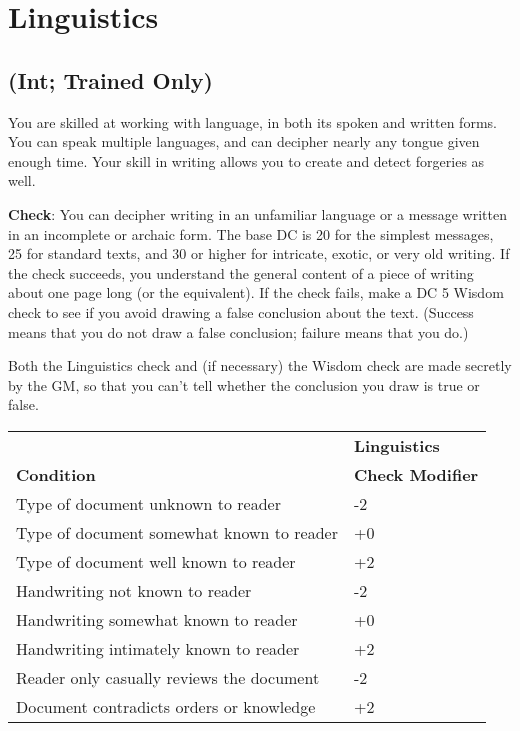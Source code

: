 \section{Linguistics}

\label{f0}
\subsection{(Int; Trained Only)}

				
You are skilled at working with language, in both its spoken and written forms. You can speak multiple languages, and can decipher nearly any tongue given enough time. Your skill in writing allows you to create and detect forgeries as well.
				
\textbf{Check}: You can decipher writing in an unfamiliar language or a message written in an incomplete or archaic form. The base DC is 20 for the simplest messages, 25 for standard texts, and 30 or higher for intricate, exotic, or very old writing. If the check succeeds, you understand the general content of a piece of writing about one page long (or the equivalent). If the check fails, make a DC 5 Wisdom check to see if you avoid drawing a false conclusion about the text. (Success means that you do not draw a false conclusion; failure means that you do.)
				
Both the Linguistics check and (if necessary) the Wisdom check are made secretly by the GM, so that you can't tell whether the conclusion you draw is true or false.

\begin{table}
 \sffamily
 \begin{tabular}{ll}
                   & \textbf{Linguistics} \\
\textbf{Condition} & \textbf{Check Modifier}\\
Type of document unknown to reader&-2\\
Type of document somewhat known to reader &+0\\
Type of document well known to reader & +2 \\
Handwriting not known to reader & -2\\
Handwriting somewhat known to reader & +0\\
Handwriting intimately known to reader & +2\\
Reader only casually reviews the document & -2\\
Document contradicts orders or knowledge & +2\\
 \end{tabular}

\end{table}
		

